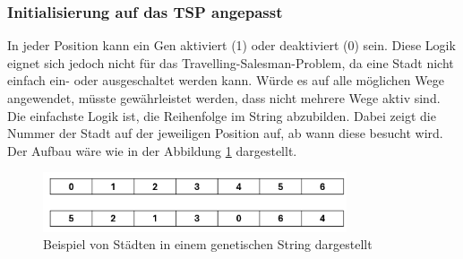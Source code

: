 \subsubsection{Initialisierung auf das TSP angepasst
\label{buch:paper:varalg:subsection:initialization_tsp}}
In jeder Position kann ein Gen aktiviert (1) oder deaktiviert (0) sein.
Diese Logik eignet sich jedoch nicht für das
Travelling-Salesman-Problem, da eine Stadt nicht einfach
ein- oder ausgeschaltet werden kann.
Würde es auf alle möglichen Wege angewendet, müsste gewährleistet werden, 
dass nicht mehrere Wege aktiv sind. Die einfachste Logik ist, die Reihenfolge  
im String abzubilden. Dabei zeigt die Nummer der Stadt auf der jeweiligen Position
auf, ab wann diese besucht wird. Der Aufbau wäre wie in der 
Abbildung \ref{fig:cities_genetic_string} dargestellt.
\begin{figure}
	\centering
	\includegraphics[width=0.8\textwidth]{
        papers/varalg/images/teil3/02GeneticStringCities.png
        }
	\caption{Beispiel von Städten in einem genetischen String dargestellt}
	\label{fig:cities_genetic_string}
\end{figure}
